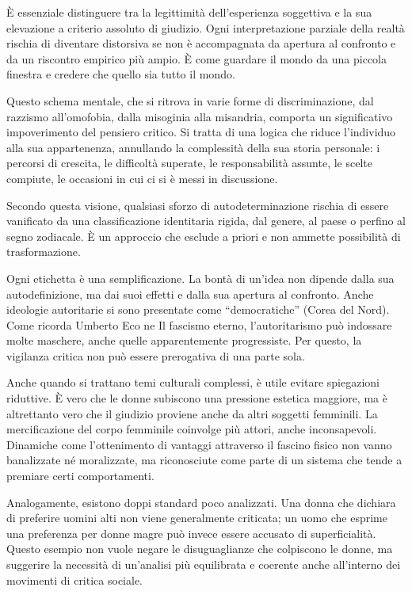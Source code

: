 \documentclass[12pt]{book} %
\begin{document}
È essenziale distinguere tra la legittimità dell’esperienza soggettiva e la sua elevazione a criterio assoluto di giudizio. Ogni interpretazione parziale della realtà rischia di diventare distorsiva se non è accompagnata da apertura al confronto e da un riscontro empirico più ampio. È come guardare il mondo da una piccola finestra e credere che quello sia tutto il mondo.

Questo schema mentale, che si ritrova in varie forme di discriminazione, dal razzismo all’omofobia, dalla misoginia alla misandria, comporta un significativo impoverimento del pensiero critico. Si tratta di una logica che riduce l’individuo alla sua appartenenza, annullando la complessità della sua storia personale: i percorsi di crescita, le difficoltà superate, le responsabilità assunte, le scelte compiute, le occasioni in cui ci si è messi in discussione.

Secondo questa visione, qualsiasi sforzo di autodeterminazione rischia di essere vanificato da una classificazione identitaria rigida, dal genere, al paese o perfino al segno zodiacale. È un approccio che esclude a priori e non ammette possibilità di trasformazione.

Ogni etichetta è una semplificazione. La bontà di un’idea non dipende dalla sua autodefinizione, ma dai suoi effetti e dalla sua apertura al confronto. Anche ideologie autoritarie si sono presentate come “democratiche” (Corea del Nord). Come ricorda Umberto Eco ne Il fascismo eterno, l’autoritarismo può indossare molte maschere, anche quelle apparentemente progressiste. Per questo, la vigilanza critica non può essere prerogativa di una parte sola.

Anche quando si trattano temi culturali complessi, è utile evitare spiegazioni riduttive. È vero che le donne subiscono una pressione estetica maggiore, ma è altrettanto vero che il giudizio proviene anche da altri soggetti femminili. La mercificazione del corpo femminile coinvolge più attori, anche inconsapevoli. Dinamiche come l’ottenimento di vantaggi attraverso il fascino fisico non vanno banalizzate né moralizzate, ma riconosciute come parte di un sistema che tende a premiare certi comportamenti.

Analogamente, esistono doppi standard poco analizzati. Una donna che dichiara di preferire uomini alti non viene generalmente criticata; un uomo che esprime una preferenza per donne magre può invece essere accusato di superficialità. Questo esempio non vuole negare le disuguaglianze che colpiscono le donne, ma suggerire la necessità di un’analisi più equilibrata e coerente anche all’interno dei movimenti di critica sociale.
\end{document}
